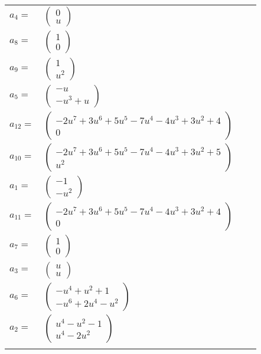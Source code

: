 \documentclass[1p]{elsarticle_modified}
\theoremstyle{definition}
\begin{document}
\begin{tabular}{m{7pt} m{180pt} m{7pt} m{180pt} }
\flushright $a_{4}=$&$\begin{pmatrix}0\\u\end{pmatrix}$ \\
\flushright $a_{8}=$&$\begin{pmatrix}1\\0\end{pmatrix}$ \\
\flushright $a_{9}=$&$\begin{pmatrix}1\\u^2\end{pmatrix}$ \\
\flushright $a_{5}=$&$\begin{pmatrix}- u\\- u^3+u\end{pmatrix}$ \\
\flushright $a_{12}=$&$\begin{pmatrix}-2 u^7+3 u^6+5 u^5-7 u^4-4 u^3+3 u^2+4\\0\end{pmatrix}$ \\
\flushright $a_{10}=$&$\begin{pmatrix}-2 u^7+3 u^6+5 u^5-7 u^4-4 u^3+3 u^2+5\\u^2\end{pmatrix}$ \\
\flushright $a_{1}=$&$\begin{pmatrix}-1\\- u^2\end{pmatrix}$ \\
\flushright $a_{11}=$&$\begin{pmatrix}-2 u^7+3 u^6+5 u^5-7 u^4-4 u^3+3 u^2+4\\0\end{pmatrix}$ \\
\flushright $a_{7}=$&$\begin{pmatrix}1\\0\end{pmatrix}$ \\
\flushright $a_{3}=$&$\begin{pmatrix}u\\u\end{pmatrix}$ \\
\flushright $a_{6}=$&$\begin{pmatrix}- u^4+u^2+1\\- u^6+2 u^4- u^2\end{pmatrix}$ \\
\flushright $a_{2}=$&$\begin{pmatrix}u^4- u^2-1\\u^4-2 u^2\end{pmatrix}$\\&\end{tabular}
\end{document}

